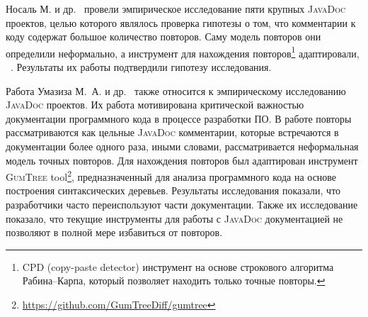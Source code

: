 Носаль М. и др.~\cite{poruban2016preliminary} провели эмпирическое исследование пяти крупных \textsc{JavaDoc} проектов, целью которого являлось проверка гипотезы о том, что комментарии к коду содержат большое количество повторов.
Саму модель повторов они определили неформально, а инструмент для нахождения повторов\footnote{\textsc{CPD} (copy-paste detector) инструмент на основе строкового алгоритма Рабина--Карпа, который позволяет находить только точные повторы.} адаптировали, ~\cite{juergens2010can}.
Результаты их работы подтвердили гипотезу исследования. 

Работа Умазиза М.\, А. и др.~\cite{oumaziz2017documentation} также относится к эмпирическому исследованию \textsc{JavaDoc} проектов. 
Их работа мотивирована критической важностью документации программного кода в процессе разработки ПО.
В работе повторы рассматриваются как цельные \textsc{JavaDoc} комментарии, которые встречаются в документации более одного раза, иными словами, рассматривается неформальная модель точных повторов.
Для нахождения повторов был адаптирован инструмент \textsc{GumTree} tool\footnote{\url{https://github.com/GumTreeDiff/gumtree}}, предназначенный для анализа программного кода на основе построения синтаксических деревьев.
Результаты исследования показали, что разработчики часто переиспользуют части документации.
Также их исследование показало, что текущие инструменты для работы с \textsc{JavaDoc} документацией не позволяют в полной мере избавиться от повторов.


